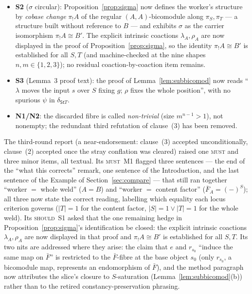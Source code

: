 \documentclass[11pt]{article}
\newcommand{\St}{\mathsf{St}}                      %
\theoremstyle{plain}
\theoremstyle{definition}
\theoremstyle{remark}
\begin{document}
\begin{itemize}[leftmargin=1.5em]
  pointwise'' mechanism to $S$-saturation.
\item \textbf{S2} ($\sigma$ circular): Proposition~\ref{prop:sigma} now defines the worker's
  structure by \emph{cobase change} $\pi_!A$ of the regular $(A,A)$-bicomodule along
  $\pi_S,\pi_T$ --- a structure built without reference to $B$ --- and exhibits $\sigma$ as
  the carrier isomorphism $\pi_!A\cong B'$. The explicit intrinsic coactions
  $\lambda_A,\rho_A$ are now displayed in the proof of Proposition~\ref{prop:sigma}, so the
  identity $\pi_!A\cong B'$ is established for all $S,T$ (and machine-checked at the nine
  shapes $n,m\in\{1,2,3\}$); no residual coaction-by-coaction item remains.
\item \textbf{S3} (Lemma~3 proof text): the proof of Lemma~\ref{lem:subbicomod} now reads
  ``$\lambda$ moves the input $s$ over $S$ fixing $g$; $\rho$ fixes the whole position'', with
  no spurious $\psi$ in $\delta_{\St T}$.
\item \textbf{N1/N2}: the discarded fibre is called \emph{non-trivial} (size $m^{n-1}>1$),
  not nonempty; the redundant third refutation of clause~(3) has been removed.
\end{itemize}

\noindent The third-round report (a near-endorsement: clause~(3) accepted unconditionally,
clause~(2) accepted once the stray conflation was cleared) raised one \textsc{must} and three
minor items, all textual. Its \textsc{must}~M1 flagged three sentences --- the end of the
``what this corrects'' remark, one sentence of the Introduction, and the last sentence of the
Example of Section~\ref{sec:compare} --- that still ran together ``worker $=$ whole weld''
($A=B$) and ``worker $=$ content factor'' ($\bar F_A=(-)^S$); all three now state the correct
reading, labelling which equality each locus criterion governs ($|T|=1$ for the content
factor, $|S|=1\vee|T|=1$ for the whole weld). Its \textsc{should}~S1 asked that the one
remaining hedge in Proposition~\ref{prop:sigma}'s identification be closed: the explicit
intrinsic coactions $\lambda_A,\rho_A$ are now displayed in that proof and $\pi_!A\cong B'$ is
established for all $S,T$. Its two nits are addressed where they arise: the claim that $e$ and
$r_{s_0}$ ``induce the same map on $\bar F$'' is restricted to the $\bar F$-fibre at the base
object $s_0$ (only $r_{s_0}$, a bicomodule map, represents an endomorphism of $\bar F$), and
the method paragraph now attributes the slice's closure to $S$-saturation
(Lemma~\ref{lem:subbicomod}(b)) rather than to the retired constancy-preservation phrasing.
\end{document}
